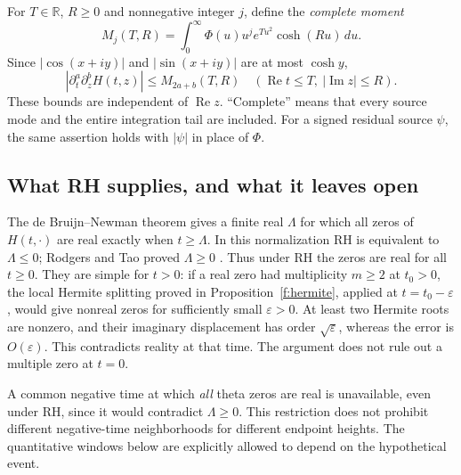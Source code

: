 For $T\in\mathbb R$, $R\geq0$ and nonnegative integer $j$, define the
\emph{complete moment}
\begin{equation}
 M_j(T,R)=\int_0^\infty \Phi(u)u^j e^{Tu^2}\cosh(Ru)\,du.
 \label{i:moments}
\end{equation}
Since $|\cos(x+iy)|$ and $|\sin(x+iy)|$ are at most $\cosh y$,
\begin{equation}
 |\partial_t^a\partial_z^bH(t,z)|\leq M_{2a+b}(T,R)
 \quad(\operatorname{Re}t\leq T,\ |\operatorname{Im}z|\leq R).
 \label{i:jet-bound}
\end{equation}
These bounds are independent of $\operatorname{Re}z$. ``Complete'' means
that every source mode and the entire integration tail are included.
For a signed residual source $\psi$, the same assertion holds with
$|\psi|$ in place of $\Phi$.

\subsection{What RH supplies, and what it leaves open}

The de Bruijn--Newman theorem gives a finite real $\Lambda$ for which
all zeros of $H(t,\cdot)$ are real exactly when $t\geq\Lambda$.
In this normalization RH is equivalent to $\Lambda\leq0$;
Rodgers and Tao proved $\Lambda\geq0$ \cite{rodgers-tao}.
Thus under RH the zeros are real for all $t\geq0$. They are simple for
$t>0$: if a real zero had multiplicity $m\geq2$ at $t_0>0$, the local
Hermite splitting proved in Proposition~\ref{f:hermite}, applied at
$t=t_0-\varepsilon$, would give nonreal zeros for sufficiently small
$\varepsilon>0$. At least two Hermite roots are nonzero, and their
imaginary displacement has order $\sqrt{\varepsilon}$, whereas the
error is $O(\varepsilon)$. This contradicts reality at that time.
The argument does not rule out a multiple zero at $t=0$.

A common negative time at which \emph{all} theta zeros are real is
unavailable, even under RH, since it would contradict $\Lambda\geq0$.
This restriction does not prohibit different negative-time neighborhoods
for different endpoint heights. The quantitative windows below are
explicitly allowed to depend on the hypothetical event.

